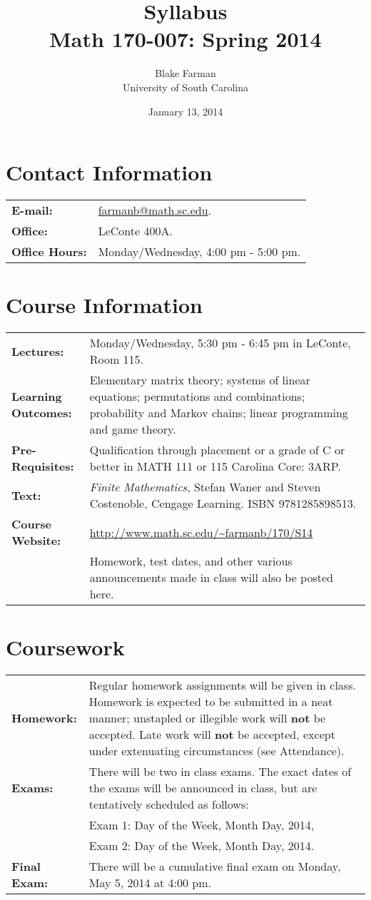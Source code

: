 \documentclass[10pt]{amsart}
\author{Blake Farman\\University of South Carolina}
\title{Syllabus\\Math 170-007: Spring 2014}
\date{January 13, 2014}
\begin{document}
\maketitle

\section*{Contact Information}
\noindent
\begin{tabular}{p{1.4in}p{5in}}
  {\bf E-mail:} &\href{mailto:farmanb@math.sc.edu}{farmanb@math.sc.edu}.\\
  {\bf Office:} & LeConte 400A.\\
  {\bf Office Hours:} & Monday/Wednesday, 4:00 pm - 5:00 pm.\\
\end{tabular}

\section*{Course Information}
\noindent
\begin{tabular}{p{1.4in}p{5in}}
  {\bf Lectures:} &
  Monday/Wednesday,  5:30 pm - 6:45 pm in LeConte, Room 115.\\
  {\bf Learning Outcomes:} & Elementary matrix theory; 
  systems of linear equations;
  permutations and combinations;
  probability and Markov chains; 
  linear programming and game theory.\\
  {\bf Pre-Requisites:} & Qualification through placement or a grade of C or better in MATH 111 or 115 Carolina Core: 3ARP.\\
  {\bf Text:} & {\it Finite Mathematics}, Stefan Waner and Steven Costenoble, Cengage Learning.  ISBN 9781285898513.\\
  {\bf Course Website:} & \url{http://www.math.sc.edu/~farmanb/170/S14}\\
  & Homework, test dates, and other various announcements made in class will also be posted here.\\
\end{tabular}

\section*{Coursework}
\noindent
\begin{tabular}{p{1.4in}p{5in}}
  {\bf Homework:} & Regular homework assignments will be given in class.
  Homework is expected to be submitted in a neat manner; unstapled or illegible work will {\bf not} be accepted.
  Late work will {\bf not} be accepted, except under extenuating circumstances (see Attendance).\\
  {\bf Exams:} & There will be two in class exams.
  The exact dates of the exams will be announced in class, but are tentatively scheduled as follows:\\
  & Exam 1: Day of the Week, Month Day, 2014,\\
  & Exam 2: Day of the Week, Month Day, 2014.\\
  {\bf Final Exam:} & There will be a cumulative final exam on Monday, May 5, 2014 at 4:00 pm.\\
\end{tabular}
\end{document}
